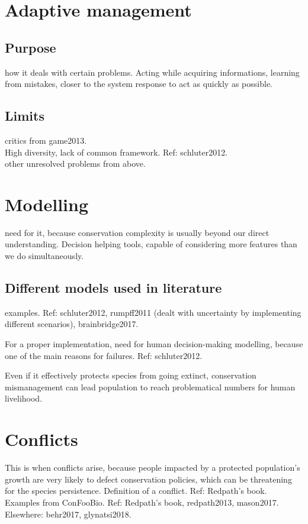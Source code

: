 \documentclass[12pt,a4paper]{article}
\begin{document}
\section{Adaptive management}

\subsection{Purpose}

how it deals with certain problems. Acting while acquiring informations, learning from mistakes, closer to the system response to act as quickly as possible.

\subsection{Limits}

critics from game2013.\\
High diversity, lack of common framework. Ref: schluter2012.\\
other unresolved problems from above.

\section{Modelling}

need for it, because conservation complexity is usually beyond our direct understanding. Decision helping tools, capable of considering more features than we do simultaneously.

\subsection{Different models used in literature}

examples. Ref: schluter2012, rumpff2011 (dealt with uncertainty by implementing different scenarios), brainbridge2017.

For a proper implementation, need for human decision-making modelling, because one of the main reasons for failures. Ref: schluter2012.

Even if it effectively protects species from going extinct, conservation mismanagement can lead population to reach problematical numbers for human livelihood.

\section{Conflicts}

This is when conflicts arise, because people impacted by a protected population's growth are very likely to defect conservation policies, which can be threatening for the species persistence.
Definition of a conflict. Ref: Redpath's book.\\
Examples from ConFooBio. Ref: Redpath's book, redpath2013, mason2017.
Elsewhere: behr2017, glynatsi2018.
\end{document}
